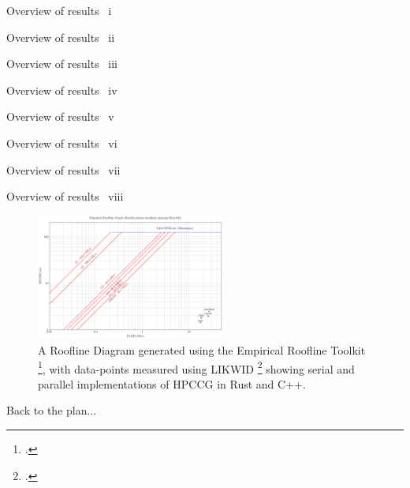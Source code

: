 \documentclass[10pt,aspectratio=169]{beamer}
\begin{document}
\begin{frame}{Overview of results \ i}
\end{frame}
\begin{frame}{Overview of results \ ii}
\end{frame}
\begin{frame}{Overview of results \ iii}
\end{frame}
\begin{frame}{Overview of results \ iv}
\end{frame}
\begin{frame}{Overview of results \ v}
\end{frame}
\begin{frame}{Overview of results \ vi}
\end{frame}
\begin{frame}{Overview of results \ vii}
\end{frame}
\begin{frame}{Overview of results \ viii}
    \begin{figure}[H]
        \includegraphics[width=0.55\textwidth]{images/Athena_ERT_generated_roofline.pdf}
        \caption{A Roofline Diagram generated using the Empirical Roofline Toolkit \footcite{yangEmpiricalRooflineMethodology2018}, with data-points measured using LIKWID \footcite{treibigLIKWIDLightweightPerformance2012} showing serial and parallel implementations of HPCCG in Rust and C++.}
        \label{fig:intelvtune}
    \end{figure}
\end{frame}
\begin{frame}{Back to the plan...}
    \hyperlink{demo}{}
\end{frame}

\end{document}
